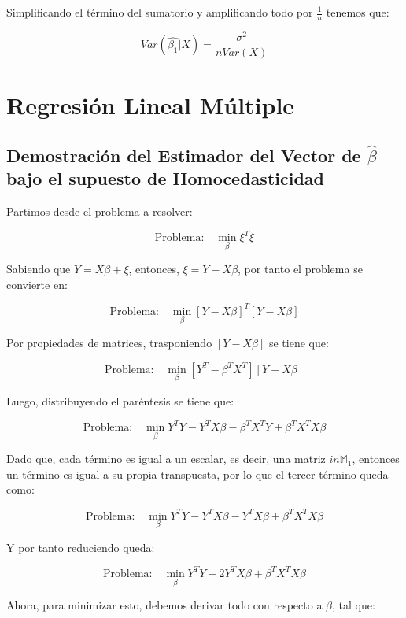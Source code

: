 \documentclass[
]{book}
\begin{document}
Simplificando el término del sumatorio y amplificando todo por \(\frac{1}{n}\) tenemos que:

\[
Var(\hat{\beta_1}| X) = \frac{\sigma^2}{nVar(X)}
\]

\section{Regresión Lineal Múltiple}\label{regresiuxf3n-lineal-muxfaltiple}

\subsection{\texorpdfstring{Demostración del Estimador del Vector de \(\hat{\beta}\) bajo el supuesto de Homocedasticidad}{Demostración del Estimador del Vector de \textbackslash hat\{\textbackslash beta\} bajo el supuesto de Homocedasticidad}}\label{demostraciuxf3n-del-estimador-del-vector-de-hatbeta-bajo-el-supuesto-de-homocedasticidad}

Partimos desde el problema a resolver:

\[
\text{Problema:} \quad \min_{\beta} \xi^T\xi
\]

Sabiendo que \(Y = X\beta + \xi\), entonces, \(\xi = Y - X\beta\), por tanto el problema se convierte en:

\[
\text{Problema:} \quad \min_{\beta} [Y-X\beta]^T[Y-X\beta]
\]

Por propiedades de matrices, trasponiendo \([Y - X\beta]\) se tiene que:

\[
\text{Problema:} \quad \min_{\beta} [Y^T - \beta^T X^T][Y-X\beta]
\]

Luego, distribuyendo el paréntesis se tiene que:

\[
\text{Problema:} \quad \min_{\beta} Y^TY - Y^TX\beta - \beta^T X^T Y + \beta^T X^T X \beta
\]

Dado que, cada término es igual a un escalar, es decir, una matriz \(in \mathbb{M}_1\), entonces un término es igual a su propia transpuesta, por lo que el tercer término queda como:

\[
\text{Problema:} \quad \min_{\beta} Y^TY - Y^TX\beta - Y^TX\beta + \beta^T X^T X \beta
\]

Y por tanto reduciendo queda:

\[
\text{Problema:} \quad \min_{\beta} Y^TY - 2 Y^TX\beta + \beta^T X^T X \beta
\]

Ahora, para minimizar esto, debemos derivar todo con respecto a \(\beta\), tal que:
\end{document}
